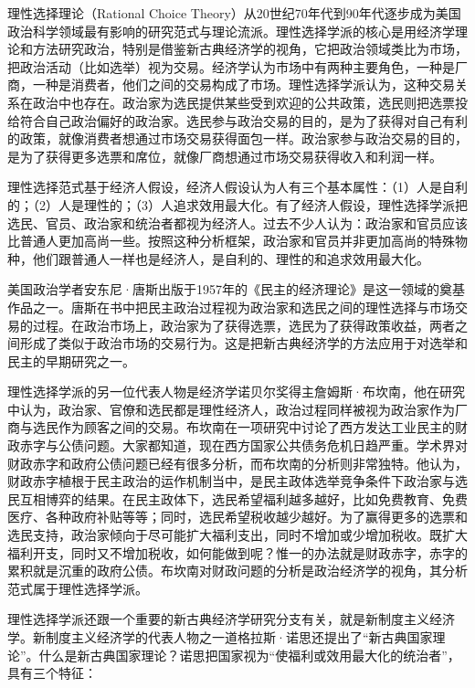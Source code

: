 理性选择理论（Rational Choice Theory）从20世纪70年代到90年代逐步成为美国政治科学领域最有影响的研究范式与理论流派。理性选择学派的核心是用经济学理论和方法研究政治，特别是借鉴新古典经济学的视角，它把政治领域类比为市场，把政治活动（比如选举）视为交易。经济学认为市场中有两种主要角色，一种是厂商，一种是消费者，他们之间的交易构成了市场。理性选择学派认为，这种交易关系在政治中也存在。政治家为选民提供某些受到欢迎的公共政策，选民则把选票投给符合自己政治偏好的政治家。选民参与政治交易的目的，是为了获得对自己有利的政策，就像消费者想通过市场交易获得面包一样。政治家参与政治交易的目的，是为了获得更多选票和席位，就像厂商想通过市场交易获得收入和利润一样。

理性选择范式基于经济人假设，经济人假设认为人有三个基本属性：（1）人是自利的；（2）人是理性的；（3）人追求效用最大化。有了经济人假设，理性选择学派把选民、官员、政治家和统治者都视为经济人。过去不少人认为：政治家和官员应该比普通人更加高尚一些。按照这种分析框架，政治家和官员并非更加高尚的特殊物种，他们跟普通人一样也是经济人，是自利的、理性的和追求效用最大化。

美国政治学者安东尼·唐斯出版于1957年的《民主的经济理论》是这一领域的奠基作品之一。唐斯在书中把民主政治过程视为政治家和选民之间的理性选择与市场交易的过程。在政治市场上，政治家为了获得选票，选民为了获得政策收益，两者之间形成了类似于政治市场的交易行为。这是把新古典经济学的方法应用于对选举和民主的早期研究之一。

理性选择学派的另一位代表人物是经济学诺贝尔奖得主詹姆斯·布坎南，他在研究中认为，政治家、官僚和选民都是理性经济人，政治过程同样被视为政治家作为厂商与选民作为顾客之间的交易。布坎南在一项研究中讨论了西方发达工业民主的财政赤字与公债问题。大家都知道，现在西方国家公共债务危机日趋严重。学术界对财政赤字和政府公债问题已经有很多分析，而布坎南的分析则非常独特。他认为，财政赤字植根于民主政治的运作机制当中，是民主政体选举竞争条件下政治家与选民互相博弈的结果。在民主政体下，选民希望福利越多越好，比如免费教育、免费医疗、各种政府补贴等等；同时，选民希望税收越少越好。为了赢得更多的选票和选民支持，政治家倾向于尽可能扩大福利支出，同时不增加或少增加税收。既扩大福利开支，同时又不增加税收，如何能做到呢？惟一的办法就是财政赤字，赤字的累积就是沉重的政府公债。布坎南对财政问题的分析是政治经济学的视角，其分析范式属于理性选择学派。

理性选择学派还跟一个重要的新古典经济学研究分支有关，就是新制度主义经济学。新制度主义经济学的代表人物之一道格拉斯·诺思还提出了“新古典国家理论”。什么是新古典国家理论？诺思把国家视为“使福利或效用最大化的统治者”，具有三个特征：

